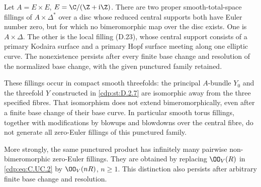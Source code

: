 
\begin{proposition}\label{cdp:st:C.2.UN.3}
Let $A=E\times E$, $E=\C/(\Z+\mathrm i\Z)$.
There are two proper smooth-total-space fillings of
$A\times\Delta^*$ over a disc whose reduced central
supports both have Euler number zero, but for which
no bimeromorphic map over the disc exists. One is
$A\times\Delta$. The other is the local filling
(D.23), whose central support consists of a primary
Kodaira surface and a primary Hopf surface meeting
along one elliptic curve. The nonexistence persists
after every finite base change and resolution of the
normalized base change, with the given punctured
family retained.

These fillings occur in compact smooth threefolds:
the principal $A$-bundle $Y_0$ and the threefold $Y$
constructed in \ref{cdp:st:D.2.7} are isomorphic away from the
three specified fibres. That isomorphism does not
extend bimeromorphically, even after a finite base
change of their base curve. In particular smooth
torus fillings, together with modifications by
blowups and blowdowns over the central fibre, do
not generate all zero-Euler fillings of this
punctured family.

More strongly, the same punctured product has
infinitely many pairwise non-bimeromorphic
zero-Euler fillings. They are obtained by replacing
$\OO_V(R)$ in \eqref{cdp:eq:C.UC.2} by $\OO_V(nR)$,
$n\ge1$. This distinction also persists after
arbitrary finite base change and resolution.
\end{proposition}
